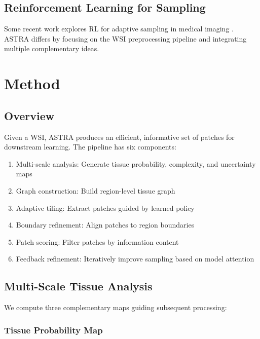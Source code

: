\documentclass[runningheads]{llncs}
\begin{document}
\subsection{Reinforcement Learning for Sampling}

Some recent work explores RL for adaptive sampling in medical imaging \cite{ref5}. ASTRA differs by focusing on the WSI preprocessing pipeline and integrating multiple complementary ideas.

\section{Method}

\label{sec:method}

\subsection{Overview}

Given a WSI, ASTRA produces an efficient, informative set of patches for downstream learning. The pipeline has six components:

\begin{enumerate}
\item Multi-scale analysis: Generate tissue probability, complexity, and uncertainty maps
\item Graph construction: Build region-level tissue graph
\item Adaptive tiling: Extract patches guided by learned policy
\item Boundary refinement: Align patches to region boundaries
\item Patch scoring: Filter patches by information content
\item Feedback refinement: Iteratively improve sampling based on model attention
\end{enumerate}

\subsection{Multi-Scale Tissue Analysis}

\label{sec:multiscale}

We compute three complementary maps guiding subsequent processing:

\subsubsection{Tissue Probability Map}
\end{document}
